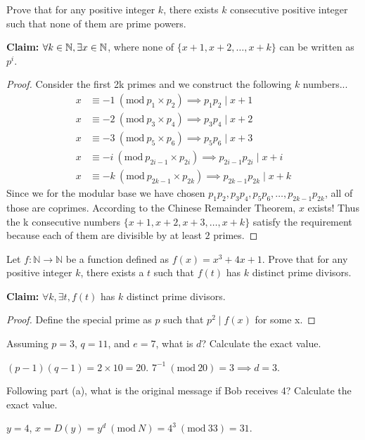 \documentclass[11pt]{article}
\newcommand{\Mod}[1]{\ (\mathrm{mod}\ #1)}
\begin{document}
\begin{Parts}
    \Part Prove that for any positive integer $k$, there exists $k$ consecutive positive integer such that none of them are prime powers.
    \begin{Answer}
        \textbf{Claim:} $\forall k \in \mathbb{N}, \exists x \in \mathbb{N}$, where none of $\{x+1, x+2, \ldots, x+k\}$ can be written as $p^i$.
        \begin{proof}
            Consider the first 2k primes and we construct the following $k$ numbers...
            \begin{align*}
                x &\equiv -1 \Mod{p_1 \times p_2}         \implies p_1p_2           \mid x + 1 \\
                x &\equiv -2 \Mod{p_3 \times p_4}         \implies p_3p_4           \mid x + 2 \\
                x &\equiv -3 \Mod{p_5 \times p_6}         \implies p_5p_6           \mid x + 3 \\
                x &\equiv -i \Mod{p_{2i-1} \times p_{2i}} \implies p_{2i - 1}p_{2i} \mid x + i \\
                x &\equiv -k \Mod{p_{2k-1} \times p_{2k}} \implies p_{2k - 1}p_{2k} \mid x + k            
            \end{align*}
            Since we for the modular base we have chosen $p_1p_2, p_3p_4, p_5p_6, \ldots, p_{2k-1}p_{2k}$, all of those are coprimes. According to the Chinese Remainder Theorem, $x$ exists! 
            Thus the k consecutive numbers $\{x+1,x+2,x+3,\ldots,x+k\}$ satisfy the requirement because each of them are divisible by at least $2$ primes. 
        \end{proof}
    \end{Answer}

    \Part Let $f:\mathbb{N} \to \mathbb{N}$ be a function defined as $f(x) = x^3 + 4x + 1$. Prove that for any positive integer $k$, there exists a $t$ such that $f(t)$ has $k$ distinct prime divisors.
    \begin{Answer}
        \textbf{Claim:} $\forall k, \exists t, f(t)$ has $k$ distinct prime divisors.
        \begin{proof}
            Define the special prime as $p$ such that $p^2 \mid f(x)$ for some x.
        \end{proof}
    \end{Answer}
\end{Parts}

\newpage
{}
 
\begin{Parts}
    \Part Assuming $p=3$, $q=11$, and $e=7$, what is $d$? Calculate the exact value.
    \begin{Answer}
        $(p - 1)(q - 1) = 2 \times 10 = 20$. $7^{-1} \Mod{20} = 3 \implies d = 3$.
    \end{Answer}

    \Part Following part (a), what is the original message if Bob receives 4? Calculate the exact value.
    \begin{Answer}
        $y = 4$, $x = D(y) = y^d \Mod{N} = 4^3 \Mod{33} = 31$.  
    \end{Answer}
\end{Parts}
\end{document}
